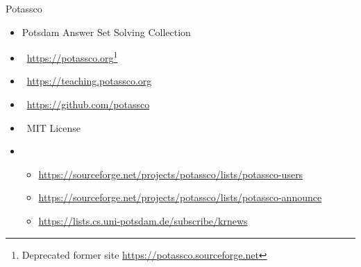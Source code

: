 \begin{frame}{Potassco}
  \bigskip
  \begin{itemize}
  \item \alert{Potsdam Answer Set Solving Collection}
    \medskip
  \item {}     \ \url{https://potassco.org}\footnote{Deprecated former site \url{https://potassco.sourceforge.net}}
  \item {} \ \url{https://teaching.potassco.org}
  \item {}  \ \url{https://github.com/potassco}
  \item {}  \ MIT License
    \medskip
  \item {}
    \begin{itemize}\scriptsize
    \item \url{https://sourceforge.net/projects/potassco/lists/potassco-users}
    \item \url{https://sourceforge.net/projects/potassco/lists/potassco-announce}
    \item \url{https://lists.cs.uni-potsdam.de/subscribe/krnews}
    \end{itemize}
  \end{itemize}
\end{frame}
%
